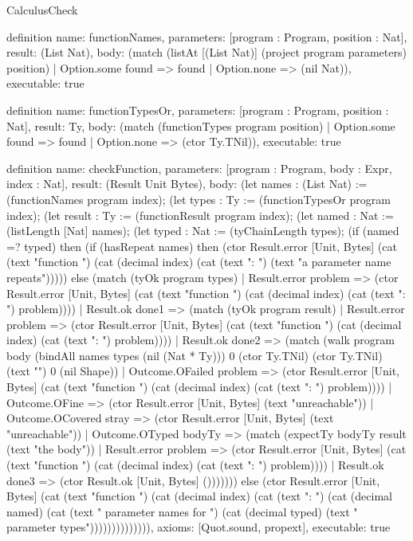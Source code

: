 \begin{lexlean}{CalculusCheck}
\begin{semanticmodule}
definition{
  name: functionNames,
  parameters: [program : Program, position : Nat],
  result: (List Nat),
  body: (match (listAt [(List Nat)] (project program parameters) position)
    | Option.some found => found
    | Option.none => (nil Nat)),
  executable: true
}

definition{
  name: functionTypesOr,
  parameters: [program : Program, position : Nat],
  result: Ty,
  body: (match (functionTypes program position)
    | Option.some found => found
    | Option.none => (ctor Ty.TNil)),
  executable: true
}

definition{
  name: checkFunction,
  parameters: [program : Program, body : Expr, index : Nat],
  result: (Result Unit Bytes),
  body: (let names : (List Nat) := (functionNames program index); (let types : Ty := (functionTypesOr program index); (let result : Ty := (functionResult program index); (let named : Nat := (listLength [Nat] names); (let typed : Nat := (tyChainLength types); (if (named =? typed) then (if (hasRepeat names) then (ctor Result.error [Unit, Bytes] (cat (text "function ") (cat (decimal index) (cat (text ": ") (text "a parameter name repeats"))))) else (match (tyOk program types)
    | Result.error problem => (ctor Result.error [Unit, Bytes] (cat (text "function ") (cat (decimal index) (cat (text ": ") problem))))
    | Result.ok done1 => (match (tyOk program result)
      | Result.error problem => (ctor Result.error [Unit, Bytes] (cat (text "function ") (cat (decimal index) (cat (text ": ") problem))))
      | Result.ok done2 => (match (walk program body (bindAll names types (nil (Nat * Ty))) 0 (ctor Ty.TNil) (ctor Ty.TNil) (text "") 0 (nil Shape))
        | Outcome.OFailed problem => (ctor Result.error [Unit, Bytes] (cat (text "function ") (cat (decimal index) (cat (text ": ") problem))))
        | Outcome.OFine => (ctor Result.error [Unit, Bytes] (text "unreachable"))
        | Outcome.OCovered stray => (ctor Result.error [Unit, Bytes] (text "unreachable"))
        | Outcome.OTyped bodyTy => (match (expectTy bodyTy result (text "the body"))
          | Result.error problem => (ctor Result.error [Unit, Bytes] (cat (text "function ") (cat (decimal index) (cat (text ": ") problem))))
          | Result.ok done3 => (ctor Result.ok [Unit, Bytes] ())))))) else (ctor Result.error [Unit, Bytes] (cat (text "function ") (cat (decimal index) (cat (text ": ") (cat (decimal named) (cat (text " parameter names for ") (cat (decimal typed) (text " parameter types")))))))))))))),
  axioms: [Quot.sound, propext],
  executable: true
}


\end{semanticmodule}
\end{lexlean}
